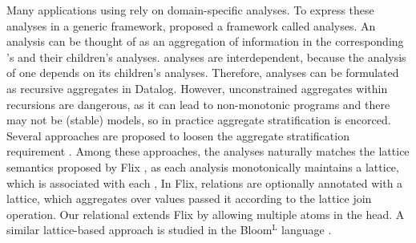 Many applications using \egraphs rely on domain-specific analyses.
To express these analyses in a generic \egraph framework, 
 \egg proposed a framework called \eclass analyses.
An \eclass analysis can be thought of as an aggregation of 
 information in the corresponding \eclass's \enodes and their children's \eclass analyses.
\Eclass analyses are interdependent,
 because the \eclass analysis of one \eclass depends on its children's \eclass analyses.
Therefore,
 \eclass analyses can be formulated as recursive aggregates in Datalog.
However, unconstrained aggregates within recursions are dangerous, 
 as it can lead to non-monotonic programs and there may not be (stable) models,
 so in practice aggregate stratification is encorced.
Several approaches are proposed to loosen the aggregate stratification requirement 
 \citep{mono-agg,bloom-lattice,datalogo,prov-semiring,flix}.
Among these approaches,
 the \eclass analyses naturally matches the lattice semantics proposed by Flix \citep{flix},
 as each \eclass analysis monotonically maintains a lattice, which is associated with each \eclass,
In Flix, relations are optionally annotated with a lattice,
 which aggregates over values passed it according to the lattice join operation.
Our relational \egraphs extends Flix by allowing multiple atoms in the head.
A similar lattice-based approach is studied 
 in the Bloom$^\text{L}$ language \citep{bloom-lattice}.







